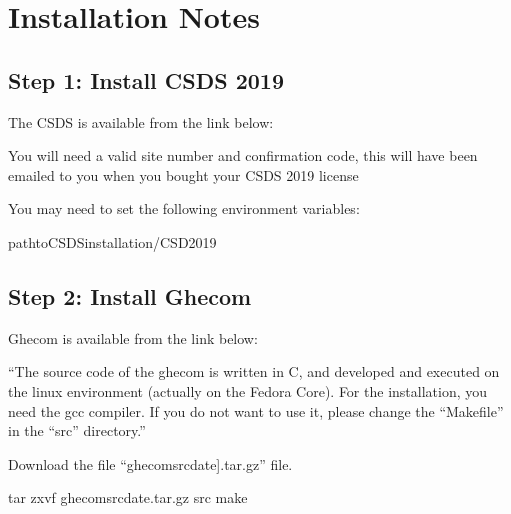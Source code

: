 \documentclass[letterpaper,10pt,english]{sphinxmanual}
\begin{document}
\chapter{Installation Notes}
\label{\detokenize{tutorial:installation-notes}}

\section{Step 1: Install CSDS 2019}
\label{\detokenize{tutorial:step-1-install-csds-2019}}
The CSDS is available from the link below:


You will need a valid site number and confirmation code, this will have been emailed to you when you bought your
CSDS 2019 license

You may need to set the following environment variables:

\begin{sphinxVerbatim}[commandchars=\\\{\}]
 \PYGZlt{}path\PYGZus{}to\PYGZus{}CSDS\PYGZus{}installation\PYGZgt{}/CSD\PYGZus{}2019
\end{sphinxVerbatim}


\section{Step 2: Install Ghecom}
\label{\detokenize{tutorial:step-2-install-ghecom}}
Ghecom is available from the link below:


“The source code of the ghecom is written in C, and developed and executed on
the linux environment (actually on the Fedora Core).  For the installation,
you need the gcc compiler.  If you do not want to use it, please change the
“Makefile” in the “src” directory.”

Download the file “ghecom\sphinxhyphen{}src\sphinxhyphen{}{[}date{]}.tar.gz” file.

\begin{sphinxVerbatim}[commandchars=\\\{\}]
tar zxvf ghecom\PYGZhy{}src\PYGZhy{}\PYG{o}{[}date\PYG{o}{]}.tar.gz
 src
make
 
\end{sphinxVerbatim}
\end{document}
